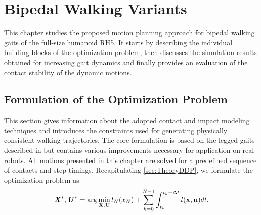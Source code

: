 
\chapter{Bipedal Walking Variants}\label{c4}
This chapter studies the proposed motion planning approach for bipedal walking gaits of the full-size humanoid RH5. It starts by describing the individual building blocks of the optimization problem, then discusses the simulation results obtained for increasing gait dynamics and finally provides an evaluation of the contact stability of the dynamic motions.

\section{Formulation of the Optimization Problem}\label{sec:BipedFormulation}
This section gives information about the adopted contact and impact modeling techniques and introduces the constraints used for generating physically consistent walking trajectories. The core formulation is based on the legged gaits described in \cite{mastalli20crocoddyl} but contains various improvements necessary for application on real robots. All motions presented in this chapter are solved for a predefined sequence of contacts and step timings. 
Recapitulating \cref{sec:TheoryDDP}, we formulate the optimization problem as
\begin{equation}\label{eqn:optimizationProblem}
\bm{\mathit{X}}^*,\bm{\mathit{U}}^*= 
\arg\min_{\mathbf{X},\mathbf{U}} l_N(x_N)+\sum_{k=0}^{N-1} \int_{t_k}^{t_k+\Delta t} l(\mathbf{x},\mathbf{u})dt. 
\end{equation}

